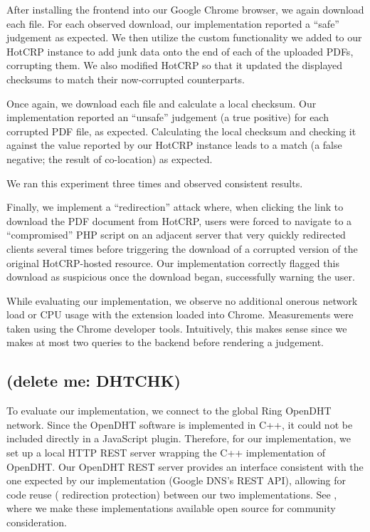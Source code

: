 After installing the frontend into our Google Chrome browser, we again download
each file. For each observed download, our implementation reported a ``safe''
judgement as expected. We then utilize the custom functionality we added to our
HotCRP instance to add junk data onto the end of each of the uploaded PDFs,
corrupting them. We also modified HotCRP so that it updated the displayed
checksums to match their now-corrupted counterparts.

Once again, we download each file and calculate a local checksum. Our
implementation reported an ``unsafe'' judgement (a true positive) for each
corrupted PDF file, as expected. Calculating the local checksum and checking it
against the value reported by our HotCRP instance leads to a match (a false
negative; \ie the result of co-location) as expected.

We ran this experiment three times and observed consistent results.

Finally, we implement a ``redirection'' attack where, when clicking the link to
download the PDF document from HotCRP, users were forced to navigate to a
``compromised'' PHP script on an adjacent server that very quickly redirected
clients several times before triggering the download of a corrupted version of
the original HotCRP-hosted resource. Our implementation correctly flagged this
download as suspicious once the download began, successfully warning the user.

While evaluating our implementation, we observe no additional onerous network
load or CPU usage with the extension loaded into Chrome. Measurements were taken
using the Chrome developer tools. Intuitively, this makes sense since we makes
at most two queries to the backend before rendering a judgement.

\subsection{(delete me: DHTCHK)}

To evaluate our implementation, we connect to the global Ring OpenDHT network.
Since the OpenDHT software is implemented in C++, it could not be included
directly in a JavaScript plugin. Therefore, for our implementation, we set up a
local HTTP REST server wrapping the C++ implementation of OpenDHT. Our OpenDHT
REST server provides an interface consistent with the one expected by our
implementation (\ie Google DNS's REST API), allowing for code reuse (\eg
redirection protection) between our two implementations. See
, where we make these implementations available open source
for community consideration.

